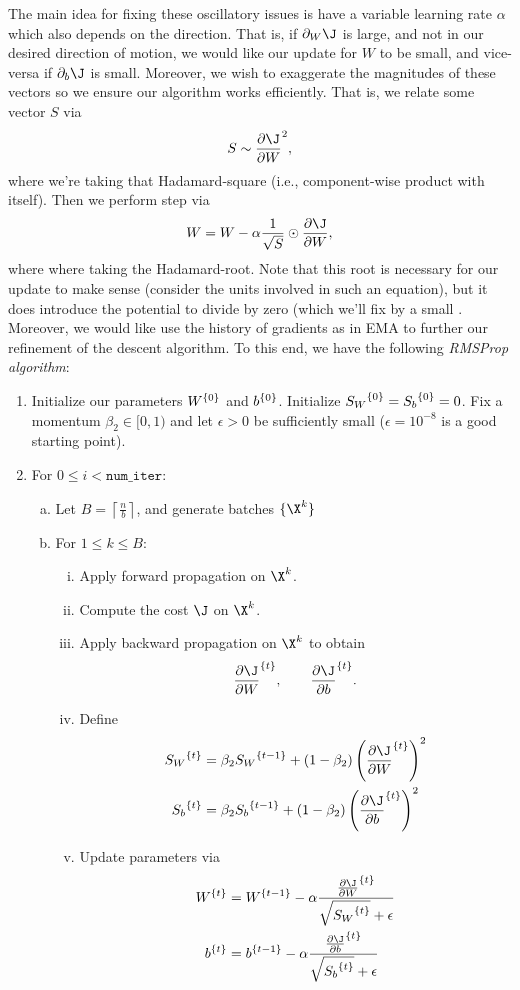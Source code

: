 The main idea for fixing these oscillatory issues is have a variable learning rate $\alpha$ which also depends on the direction.  That is, if $\partial_W\J$ is large, and not in our desired direction of motion, we would like our update for $W$ to be small, and vice-versa if $\partial_b\J$ is small.  Moreover, we wish to exaggerate the magnitudes of these vectors so we ensure our algorithm works efficiently.  That is, we relate some vector $S$ via
$$S\sim\frac{\partial\J}{\partial W}^2,$$
where we're taking that Hadamard-square (i.e., component-wise product with itself).  Then we perform step via
$$W=W-\alpha\frac{1}{\sqrt{S}}\odot\frac{\partial\J}{\partial W},$$
where where taking the Hadamard-root.  Note that this root is necessary for our update to make sense (consider the units involved in such an equation), but it does introduce the potential to divide by zero (which we'll fix by a small .  Moreover, we would like use the history of gradients as in EMA to further our refinement of the descent algorithm.  To this end, we have the following \textit{RMSProp algorithm}:
\begin{enumerate}
	\item Initialize our parameters ${W}^{\{{0}\}}$ and ${b}^{\{{0}\}}$.  Initialize ${S_W}^{\{{0}\}}={S_b}^{\{{0}\}}=0$.  Fix a momentum $\beta_2\in[0,1)$ and let $\epsilon>0$ be sufficiently small ($\epsilon=10^{-8}$ is a good starting point).
	\item For $0\leq i<\texttt{num\_iter}$:
	\begin{enumerate}[a.]
		\item Let $B=\left\lceil\frac{n}{b}\right\rceil$, and generate batches $\{\X^k\}$
		\item For $1\leq k\leq B$:
		\begin{enumerate}[i.]
			\item Apply forward propagation on $\X^k$.
			\item Compute the cost $\J$ on $\X^k$.
			\item Apply backward propagation on $\X^k$ to obtain
			$$\iter{\frac{\partial\J}{\partial W}}{t},\qquad \iter{\frac{\partial\J}{\partial b}}{t}.$$
			\item Define
			\begin{align*}
				\iter{S_W}{t}&=\beta_2\iter{S_W}{t-1}+(1-\beta_2)\left(\iter{\frac{\partial\J}{\partial W}}{t}\right)^2\\
				\iter{S_b}{t}&=\beta_2\iter{S_b}{t-1}+(1-\beta_2)\left(\iter{\frac{\partial\J}{\partial b}}{t}\right)^2
			\end{align*}
			\item Update parameters via
			\begin{align*}
				\iter{W}{t}&=\iter{W}{t-1}-\alpha\frac{\iter{\frac{\partial\J}{\partial W}}{t}}{\sqrt{\iter{S_W}{t}}+\epsilon}\\
				\iter{b}{t}&=\iter{b}{t-1}-\alpha\frac{\iter{\frac{\partial\J}{\partial b}}{t}}{\sqrt{\iter{S_b}{t}}+\epsilon}
			\end{align*}
		\end{enumerate}
	\end{enumerate}
\end{enumerate}



